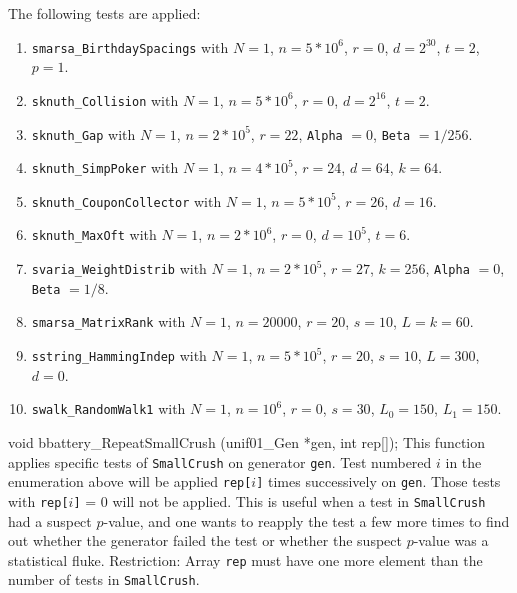   The following tests are applied:
  \endtab
  \begin{enumerate}
  \item {\tt smarsa\_BirthdaySpacings} with $N=1$,  $n=5*10^6$,  $r=0$,
   $d = 2^{30}$, $t=2$, $p=1$.

  \item {\tt sknuth\_Collision} with $N=1$,  $n=5*10^6$,  $r=0$,
   $d = 2^{16}$, $t=2$.

  \item {\tt sknuth\_Gap}  with $N=1$,  $n=2*10^5$,  $r=22$, {\tt Alpha} $=0$,
    {\tt Beta} $=1/256$.

  \item {\tt sknuth\_SimpPoker}  with $N=1$,  $n=4*10^5$,  $r=24$,
   $d = 64$, $k=64$.

  \item {\tt sknuth\_CouponCollector}  with $N=1$, $n=5*10^5$, $r=26$,
   $d=16$.

  \item {\tt  sknuth\_MaxOft}  with $N=1$,  $n=2*10^6$,  $r=0$,
   $d = 10^5$, $t=6$.

  \item {\tt  svaria\_WeightDistrib} with $N=1$, $n=2*10^5$, $r=27$,
   $k=256$, {\tt Alpha} $=0$,  {\tt Beta} $=1/8$.

  \item {\tt smarsa\_MatrixRank} with $N=1$,  $n=20000$,  $r=20$, $s=10$,
   $L = k=60$.

  \item {\tt sstring\_HammingIndep} with $N=1$, $n=5*10^5$,  $r=20$, $s=10$,
   $L = 300$, $d = 0$. 

  \item {\tt swalk\_RandomWalk1} with $N=1$, $n=10^6$,  $r=0$, $s=30$,
   $L_0 = 150$, $L_1=150$. 

  \end{enumerate}

\code


void bbattery_RepeatSmallCrush (unif01_Gen *gen, int rep[]);
\endcode
  \tab This function applies specific tests of {\tt SmallCrush} on
   generator {\tt gen}. Test numbered $i$ in the enumeration above will
  be applied {\tt rep[$i$]} times successively on  {\tt gen}. Those tests with
   {\tt rep[$i$]} = 0 will not be applied. This is useful when a test in
    {\tt SmallCrush} had a suspect $p$-value, and one wants to reapply the
  test a few more times to find out whether the generator failed
  the test or whether the suspect $p$-value was a statistical fluke.
  Restriction: Array {\tt rep} must have one more element than the
  number of tests in {\tt SmallCrush}.
 \endtab
\bigskip

